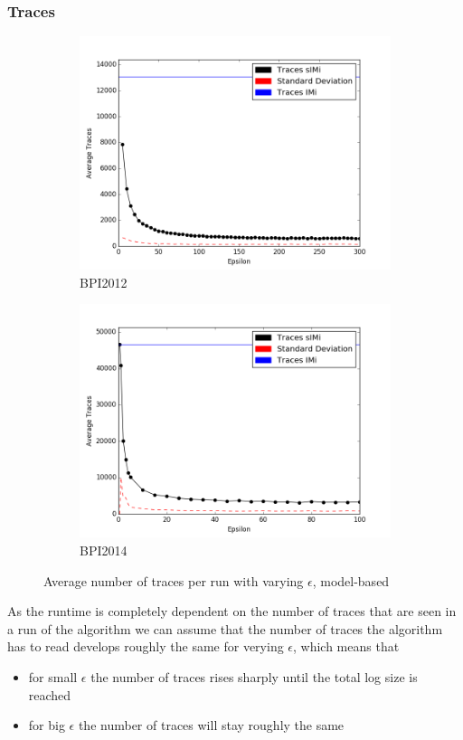 \documentclass[
	a4paper,
	pagesize,
	pdftex,
	12pt,
	twoside, %
	BCOR=5mm, %
	ngerman,
	fleqn,
	final,
	]{scrartcl}
\begin{document}
\subsubsection{Traces}
\begin{figure}[h]
	\begin{subfigure}{.5\textwidth}
	  \centering
	  \includegraphics[width=.9\linewidth]{data/BPI2012/BPI_2012_lax_threshold_traces.png}
	  \caption{BPI2012}
	  \label{fig:traces12}
	\end{subfigure}%
	\begin{subfigure}{.5\textwidth}
	  \centering
	  \includegraphics[width=.9\linewidth]{data/BPI2014/BPI2014_lax_threshold_traces.png}
	  \caption{BPI2014}
	  \label{fig:traces14}
	\end{subfigure}
	\caption{Average number of traces per run with varying $\epsilon$, model-based}
	\label{fig:traces1214}
\end{figure}
As the runtime is completely dependent on the number of traces that are seen in a run of the algorithm we can assume that the number of traces the algorithm has to read develops roughly the same for verying $\epsilon$, which means that
\begin{itemize}
\item for small $\epsilon$ the number of traces rises sharply until the total log size is reached
\item for big $\epsilon$ the number of traces will stay roughly the same
\end{itemize}
\end{document}
